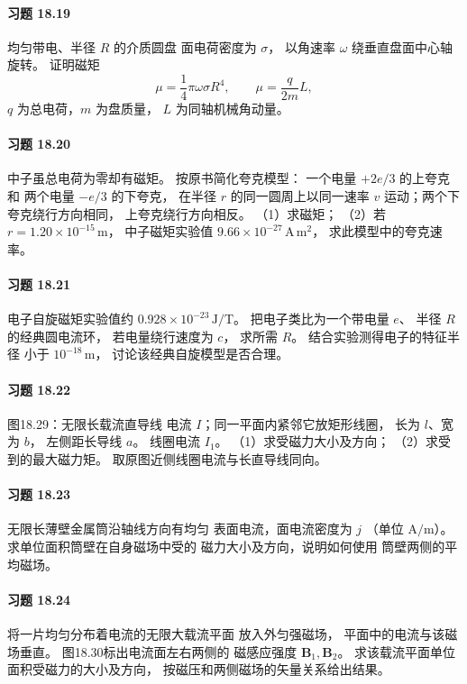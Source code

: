 \paragraph{习题 18.19}
均匀带电、半径 \(R\) 的介质圆盘
面电荷密度为 \(\sigma\)，
以角速率 \(\omega\) 绕垂直盘面中心轴旋转。
证明磁矩
\[
 \mu=\frac14\pi\omega\sigma R^4,
 \qquad
 \mu=\frac q{2m}L,
\]
\(q\) 为总电荷，\(m\) 为盘质量，
\(L\) 为同轴机械角动量。

\paragraph{习题 18.20}
中子虽总电荷为零却有磁矩。
按原书简化夸克模型：
一个电量 \(+2e/3\) 的上夸克和
两个电量 \(-e/3\) 的下夸克，
在半径 \(r\) 的同一圆周上以同一速率 \(v\)
运动；两个下夸克绕行方向相同，
上夸克绕行方向相反。
（1）求磁矩；
（2）若 \(r=1.20\times10^{-15}\,\mathrm m\)，
中子磁矩实验值
\(9.66\times10^{-27}\,\mathrm{A\,m^2}\)，
求此模型中的夸克速率。

\paragraph{习题 18.21}
电子自旋磁矩实验值约
\(0.928\times10^{-23}\,\mathrm{J/T}\)。
把电子类比为一个带电量 \(e\)、
半径 \(R\) 的经典圆电流环，
若电量绕行速度为 \(c\)，
求所需 \(R\)。
结合实验测得电子的特征半径
小于 \(10^{-18}\,\mathrm m\)，
讨论该经典自旋模型是否合理。

\paragraph{习题 18.22}
图18.29：无限长载流直导线
电流 \(I\)；同一平面内紧邻它放矩形线圈，
长为 \(l\)、宽为 \(b\)，
左侧距长导线 \(a\)。
线圈电流 \(I_1\)。
（1）求受磁力大小及方向；
（2）求受到的最大磁力矩。
取原图近侧线圈电流与长直导线同向。

\paragraph{习题 18.23}
无限长薄壁金属筒沿轴线方向有均匀
表面电流，面电流密度为 \(j\)
（单位 \(\mathrm{A/m}\)）。
求单位面积筒壁在自身磁场中受的
磁力大小及方向，说明如何使用
筒壁两侧的平均磁场。

\paragraph{习题 18.24}
将一片均匀分布着电流的无限大载流平面
放入外匀强磁场，
平面中的电流与该磁场垂直。
图18.30标出电流面左右两侧的
磁感应强度 \(\boldsymbol B_1,\boldsymbol B_2\)。
求该载流平面单位面积受磁力的大小及方向，
按磁压和两侧磁场的矢量关系给出结果。

